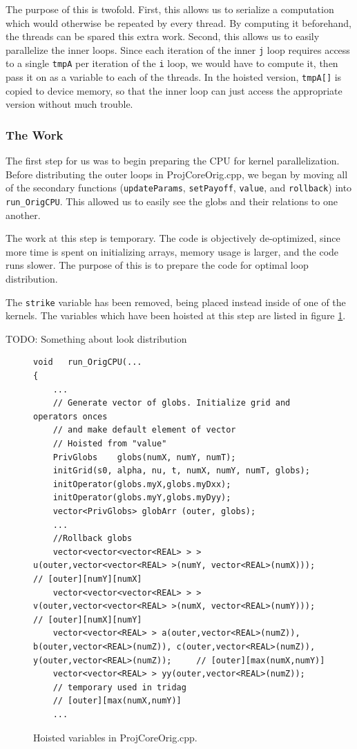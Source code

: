 \documentclass[12pt, oneside]{article}
\begin{document}
The purpose of this is twofold. First, this allows us to serialize a computation which would otherwise be repeated by every thread. By computing it beforehand, the threads can be spared this extra work. Second, this allows us to easily parallelize the inner loops. Since each iteration of the inner \texttt{j} loop requires access to a single \texttt{tmpA} per iteration of the \texttt{i} loop, we would have to compute it, then pass it on as a variable to each of the threads. In the hoisted version, \texttt{tmpA[]} is copied to device memory, so that the inner loop can just access the appropriate version without much trouble.
\subsubsection{The Work}
The first step for us was to begin preparing the CPU for kernel parallelization. Before distributing the outer loops in ProjCoreOrig.cpp, we began by moving all of the secondary functions (\texttt{updateParams}, \texttt{setPayoff}, \texttt{value}, and \texttt{rollback}) into \texttt{run\_OrigCPU}. This allowed us to easily see the globs and their relations to one another.
		
The work at this step is temporary. The code is objectively de-optimized, since more time is spent on initializing arrays, memory usage is larger, and the code runs slower. The purpose of this is to prepare the code for optimal loop distribution.
		
The \texttt{strike} variable has been removed, being placed instead inside of one of the kernels. The variables which have been hoisted at this step are listed in figure \ref{fig:globs}.

TODO: Something about look distribution

\begin{figure}[h]
\begin{lstlisting}
void   run_OrigCPU(...
{   
	...
	// Generate vector of globs. Initialize grid and operators onces
	// and make default element of vector
	// Hoisted from "value"
	PrivGlobs    globs(numX, numY, numT);
	initGrid(s0, alpha, nu, t, numX, numY, numT, globs);
	initOperator(globs.myX,globs.myDxx);
	initOperator(globs.myY,globs.myDyy);
	vector<PrivGlobs> globArr (outer, globs);
	...
	//Rollback globs
	vector<vector<vector<REAL> > > u(outer,vector<vector<REAL> >(numY, vector<REAL>(numX)));   // [outer][numY][numX]
	vector<vector<vector<REAL> > > v(outer,vector<vector<REAL> >(numX, vector<REAL>(numY)));   // [outer][numX][numY]
	vector<vector<REAL> > a(outer,vector<REAL>(numZ)), b(outer,vector<REAL>(numZ)), c(outer,vector<REAL>(numZ)), y(outer,vector<REAL>(numZ));     // [outer][max(numX,numY)]
	vector<vector<REAL> > yy(outer,vector<REAL>(numZ));  
	// temporary used in tridag  
	// [outer][max(numX,numY)]
	...
\end{lstlisting}
\caption{ \label{fig:globs} Hoisted variables in ProjCoreOrig.cpp. }
\end{figure}
			
\end{document}
